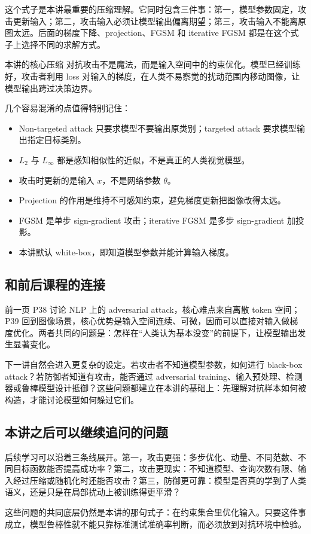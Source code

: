 \documentclass[a4paper]{article}
\begin{document}
这个式子是本讲最重要的压缩理解。它同时包含三件事：第一，模型参数固定，攻击更新输入；第二，攻击输入必须让模型输出偏离期望；第三，攻击输入不能离原图太远。后面的梯度下降、projection、FGSM 和 iterative FGSM 都是在这个式子上选择不同的求解方式。

\begin{importantbox}{本讲的核心压缩}
    对抗攻击不是魔法，而是输入空间中的约束优化。模型已经训练好，攻击者利用 loss 对输入的梯度，在人类不易察觉的扰动范围内移动图像，让模型输出跨过决策边界。
\end{importantbox}

几个容易混淆的点值得特别记住：
\begin{itemize}
    \item Non-targeted attack 只要求模型不要输出原类别；targeted attack 要求模型输出指定目标类别。
    \item $L_2$ 与 $L_\infty$ 都是感知相似性的近似，不是真正的人类视觉模型。
    \item 攻击时更新的是输入 $x$，不是网络参数 $\theta$。
    \item Projection 的作用是维持不可感知约束，避免梯度更新把图像改得太远。
    \item FGSM 是单步 sign-gradient 攻击；iterative FGSM 是多步 sign-gradient 加投影。
    \item 本讲默认 white-box，即知道模型参数并能计算输入梯度。
\end{itemize}

\subsection{和前后课程的连接}

前一页 P38 讨论 NLP 上的 adversarial attack，核心难点来自离散 token 空间；P39 回到图像场景，核心优势是输入空间连续、可微，因而可以直接对输入做梯度优化。两者共同的问题是：怎样在“人类认为基本没变”的前提下，让模型输出发生显著变化。

下一讲自然会进入更复杂的设定。若攻击者不知道模型参数，如何进行 black-box attack？若防御者知道有攻击，能否通过 adversarial training、输入预处理、检测器或鲁棒模型设计抵御？这些问题都建立在本讲的基础上：先理解对抗样本如何被构造，才能讨论模型如何躲过它们。

\subsection{本讲之后可以继续追问的问题}

后续学习可以沿着三条线展开。第一，攻击更强：多步优化、动量、不同范数、不同目标函数能否提高成功率？第二，攻击更现实：不知道模型、查询次数有限、输入经过压缩或随机化时还能否攻击？第三，防御更可靠：模型是否真的学到了人类语义，还是只是在局部扰动上被训练得更平滑？

这些问题的共同底层仍然是本讲的那句式子：在约束集合里优化输入。只要这件事成立，模型鲁棒性就不能只靠标准测试准确率判断，而必须放到对抗环境中检验。
\end{document}
